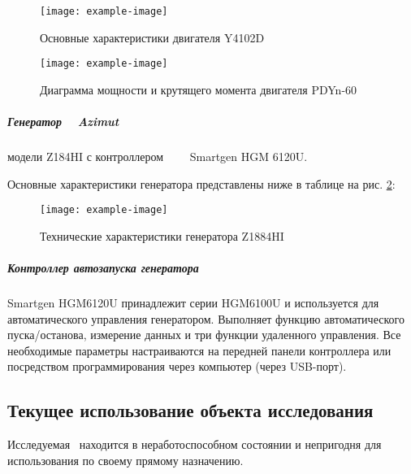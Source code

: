 \begin{figure}[H]
	\centering
	\texttt{[image: example-image]}
	\caption{Основные характеристики двигателя Y4102D}
	\label{fig:12}
\end{figure}

\begin{figure}[H]
	\centering
	\texttt{[image: example-image]}
	\caption[]{Диаграмма мощности и крутящего момента двигателя PDYn-60}
\end{figure}


\subparagraph{Генератор  
	Azimut} модели  Z184HI с контроллером   
	Smartgen HGM 6120U.
	
	Основные характеристики генератора представлены ниже в таблице на рис. \ref{fig:123}:\\
		
\begin{figure}[H]
	\centering
	\texttt{[image: example-image]}
	\caption{Технические характеристики генератора Z1884HI}
	\label{fig:123}
\end{figure}

	
	
%	
%
\subparagraph {Контроллер автозапуска генератора} Smartgen HGM6120U принадлежит серии HGM6100U и используется для автоматического управления генератором. Выполняет функцию автоматического пуска/останова, измерение данных и три функции удаленного управления. Все необходимые параметры настраиваются на передней панели контроллера или посредством программирования через компьютер (через USB-порт). 
	


\subsection{Текущее использование объекта исследования}

Исследуемая  \ находится в неработоспособном состоянии и непригодня для использования по своему прямому назначению.


